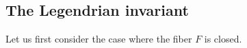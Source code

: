 \documentclass{amsart}
\newcommand{\wh}{\widehat}
\newcommand\cF{\mathcal{F}}
\def\bC{\mathbf{C}}
\def\bR{\mathbf{R}}
\theoremstyle{definition}
\theoremstyle{remark}
\newtheorem{inductive lemma}[theorem]{Inductive Lemma}
\begin{document}
\subsection{The Legendrian invariant}\label{sec: Reid inv}





 Let us first consider the case where the fiber $F$ is closed.
 
 
\end{document}

